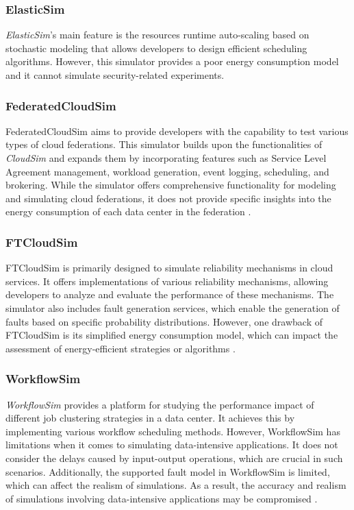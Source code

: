 {\subsubsection*{ElasticSim}
\emph{ElasticSim}'s \cite{cai2017elasticsim} main feature is the resources runtime auto-scaling based on stochastic modeling that allows developers to design efficient scheduling algorithms. However, this simulator provides a poor energy consumption model and it cannot simulate security-related experiments. \cite{mansouri2020cloud}
\subsubsection*{FederatedCloudSim}
FederatedCloudSim \cite{kohne2014federatedcloudsim} aims to provide developers with the capability to test various types of cloud federations. This simulator builds upon the functionalities of \emph{CloudSim} and expands them by incorporating features such as Service Level Agreement management, workload generation, event logging, scheduling, and brokering. While the simulator offers comprehensive functionality for modeling and simulating cloud federations, it does not provide specific insights into the energy consumption of each data center in the federation \cite{mansouri2020cloud}.
\subsubsection*{FTCloudSim}
FTCloudSim \cite{zhou2013ftcloudsim} is primarily designed to simulate reliability mechanisms in cloud services. It offers implementations of various reliability mechanisms, allowing developers to analyze and evaluate the performance of these mechanisms. The simulator also includes fault generation services, which enable the generation of faults based on specific probability distributions. However, one drawback of FTCloudSim is its simplified energy consumption model, which can impact the assessment of energy-efficient strategies or algorithms \cite{mansouri2020cloud}.
\subsubsection*{WorkflowSim}
\emph{WorkflowSim} \cite{chen2012workflowsim} provides a platform for studying the performance impact of different job clustering strategies in a data center. It achieves this by implementing various workflow scheduling methods. However, WorkflowSim has limitations when it comes to simulating data-intensive applications. It does not consider the delays caused by input-output operations, which are crucial in such scenarios. Additionally, the supported fault model in WorkflowSim is limited, which can affect the realism of simulations. As a result, the accuracy and realism of simulations involving data-intensive applications may be compromised \cite{mansouri2020cloud}. 
}
